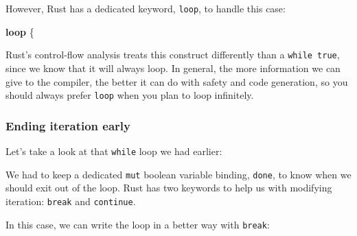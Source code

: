\documentclass[a4paper,]{book}
\newenvironment{Shaded}{\begin{snugshade}}{\end{snugshade}}
\newcommand{\KeywordTok}[1]{\textcolor[rgb]{0.13,0.29,0.53}{\textbf{{#1}}}}
\newcommand{\DecValTok}[1]{\textcolor[rgb]{0.00,0.00,0.81}{{#1}}}
\newcommand{\StringTok}[1]{\textcolor[rgb]{0.31,0.60,0.02}{{#1}}}
\newcommand{\OtherTok}[1]{\textcolor[rgb]{0.56,0.35,0.01}{{#1}}}
\newcommand{\NormalTok}[1]{{#1}}
\begin{document}
However, Rust has a dedicated keyword, \texttt{loop}, to handle this
case:

\begin{Shaded}
\begin{Highlighting}[]
\KeywordTok{loop} \NormalTok{\{}
\end{Highlighting}
\end{Shaded}

Rust's control-flow analysis treats this construct differently than a
\texttt{while\ true}, since we know that it will always loop. In
general, the more information we can give to the compiler, the better it
can do with safety and code generation, so you should always prefer
\texttt{loop} when you plan to loop infinitely.

\subsubsection{Ending iteration early}\label{ending-iteration-early}

Let's take a look at that \texttt{while} loop we had earlier:

\begin{Shaded}
\end{Shaded}

We had to keep a dedicated \texttt{mut} boolean variable binding,
\texttt{done}, to know when we should exit out of the loop. Rust has two
keywords to help us with modifying iteration: \texttt{break} and
\texttt{continue}.

In this case, we can write the loop in a better way with \texttt{break}:

\begin{Shaded}
\end{Shaded}
\end{document}
